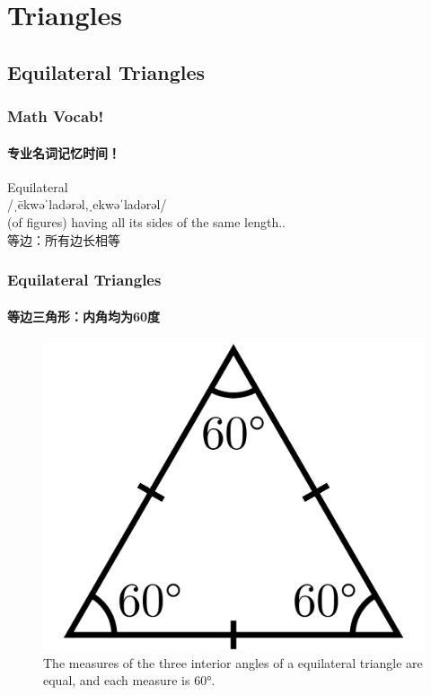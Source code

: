 \documentclass[
	11pt, %
]{beamer}
\begin{document}

\section{Triangles}


\subsection{Equilateral Triangles}


\begin{frame}
	\frametitle{Math Vocab!} %
	\framesubtitle{专业名词记忆时间！}
	
	{\Huge Equilateral}\\
	{\LARGE /ˌēkwəˈladərəl,ˌekwəˈladərəl/\\
		\bigskip\bigskip
	(of figures) having all its sides of the same length.. \\ 
	等边：所有边长相等}

\end{frame}


\begin{frame}
	\frametitle{Equilateral Triangles} %
	\framesubtitle{等边三角形：内角均为60度}

		\begin{figure}
			\includegraphics[width=0.6\linewidth]{Triangle.Equilateral.svg.png}
			\caption{The measures of the three interior angles of  a equilateral triangle are
equal, and each measure is 60°.}
		\end{figure}
\end{frame}
\end{document}
